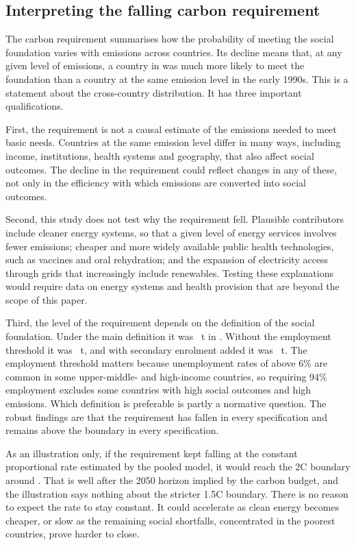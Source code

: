 \subsection{Interpreting the falling carbon requirement}

The carbon requirement summarises how the probability of meeting the social foundation varies with emissions across countries. Its decline means that, at any given level of emissions, a country in \nLastYear{} was much more likely to meet the foundation than a country at the same emission level in the early 1990s. This is a statement about the cross-country distribution. It has three important qualifications.

First, the requirement is not a causal estimate of the emissions needed to meet basic needs. Countries at the same emission level differ in many ways, including income, institutions, health systems and geography, that also affect social outcomes. The decline in the requirement could reflect changes in any of these, not only in the efficiency with which emissions are converted into social outcomes.

Second, this study does not test why the requirement fell. Plausible contributors include cleaner energy systems, so that a given level of energy services involves fewer emissions; cheaper and more widely available public health technologies, such as vaccines and oral rehydration; and the expansion of electricity access through grids that increasingly include renewables. Testing these explanations would require data on energy systems and health provision that are beyond the scope of this paper.

Third, the level of the requirement depends on the definition of the social foundation. Under the main definition it was \nReqEnd~t in \nLastYear. Without the employment threshold it was \nRobReqNoEmp~t, and with secondary enrolment added it was \nRobReqEdu~t. The employment threshold matters because unemployment rates of above 6\% are common in some upper-middle- and high-income countries, so requiring 94\% employment excludes some countries with high social outcomes and high emissions. Which definition is preferable is partly a normative question. The robust findings are that the requirement has fallen in every specification and remains above the boundary in every specification.

As an illustration only, if the requirement kept falling at the constant proportional rate estimated by the pooled model, it would reach the 2\textdegree C boundary around \nReqReachYear{}. That is well after the 2050 horizon implied by the carbon budget, and the illustration says nothing about the stricter 1.5\textdegree C boundary. There is no reason to expect the rate to stay constant. It could accelerate as clean energy becomes cheaper, or slow as the remaining social shortfalls, concentrated in the poorest countries, prove harder to close.

